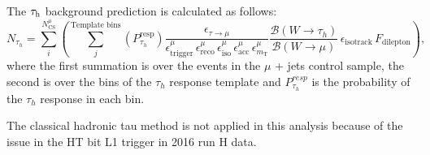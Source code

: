 The $\tau_\mathrm{h}$ background prediction is calculated as follows:
\begin{equation}
N_{\tau_{h}} = \sum\limits_i^{N_\mathrm{CS}^\mu}\left(\sum\limits_j^\text{Template bins}(P_{\tau_h}^\text{resp})
\frac{\epsilon_{\tau \rightarrow \mu}}{\epsilon^{\mu}_\text{trigger}\,\epsilon^{\mu}_\text{reco}\,\epsilon^{\mu}_\text{iso}\,\epsilon^{\mu}_\text{acc}\,\epsilon^{\mu}_{m_\text{T}}} \dfrac{ \mathcal{B}(W \rightarrow \tau_h)}{\mathcal{B}(W \rightarrow \mu)}\,\epsilon_\text{isotrack}\,F_\text{dilepton}\right),
\label{eq:tauh}
\end{equation}
where the first summation is over the events in the $\mu$ + jets control sample, the second is over the bins of the $\tau_h$ response template and $P_{\tau_h}^{resp}$ is the probability of the $\tau_h$ response in each bin.

The classical hadronic tau method is not applied in this analysis because of the issue in the HT bit L1 trigger in 2016 run H data.
